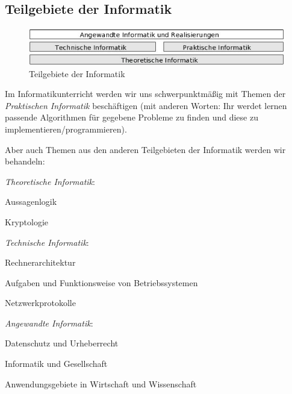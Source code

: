 \subsection{Teilgebiete der Informatik}

\begin{figure}[h]
  \centering
   \includegraphics[width=1.0\textwidth]{./inf/SEKII/03_Informatik/Architektur-der-Informatik.png}
   \caption{Teilgebiete der Informatik}
\end{figure}

Im Informatikunterricht werden wir uns schwerpunktmäßig mit Themen der
\emph{Praktischen Informatik} beschäftigen (mit anderen Worten: Ihr werdet
lernen passende Algorithmen für gegebene Probleme zu finden und diese zu
implementieren/programmieren).

Aber auch Themen aus den anderen Teilgebieten der Informatik werden wir
behandeln:

\begin{compactitem}
\item[\emph{Theoretische Informatik}:]\hspace{1cm}
  \begin{compactitem}
  \item Aussagenlogik
  \item Kryptologie
  \end{compactitem}
\item[\emph{Technische Informatik}:]\hspace{1cm}
  \begin{compactitem}
  \item Rechnerarchitektur
  \item Aufgaben und Funktionsweise von Betriebssystemen
  \item Netzwerkprotokolle
  \end{compactitem}
\item[\emph{Angewandte Informatik}:]\hspace{1cm}
  \begin{compactitem}
  \item Datenschutz und Urheberrecht
  \item Informatik und Gesellschaft
  \item Anwendungsgebiete in Wirtschaft und Wissenschaft
  \end{compactitem}
\end{compactitem}


